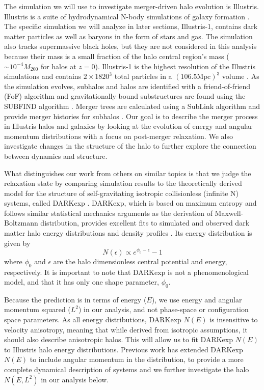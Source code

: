 \documentclass[a4paper,11pt]{article}
\begin{document}
The simulation we will use to investigate merger-driven halo evolution is Illustris.  Illustris is a suite of hydrodynamical N-body 
simulations of galaxy formation \citep{Vog15}.  The specific simulation we will analyze in later sections, Illustris-1, contains dark matter particles as well as baryons 
in the form of stars and gas.  The simulation also tracks supermassive black holes, but they are not considered in this analysis 
because their mass is a small fraction of the halo central region's mass ($\sim10^{-4}M_{200}$ for halos at $z=0$).  Illustris-1 is the highest resolution of the Illustris simulations and contains 
$2\times1820^3$ total particles in a $(106.5\text{Mpc})^3$ volume \citep{Vog14}.  As the simulation evolves, subhalos and halos are identified with a 
friend-of-friend (FoF) algorithm \citep{Dav85} and gravitationally bound substructures are found using the SUBFIND algorithm \citep{Spr01,Dol09}.  Merger 
trees are calculated using a SubLink algorithm and provide merger histories for subhalos \citep{Rod15}.  
Our goal is to describe the merger process in Illustris halos and galaxies by looking at the evolution of energy and angular momentum distributions with a focus on 
post-merger relaxation.  We also investigate changes in the structure of the halo to further explore the connection between dynamics and structure.  

What distinguishes our work from others on similar topics is that we judge the relaxation state by comparing simulation results to the theoretically derived 
model for the structure of self-gravitating isotropic collisionless (infinite N) systems, called DARKexp \citep{Hjo10,Wil10}.  DARKexp, which is based on maximum 
entropy and follows similar statistical mechanics arguments as the derivation of Maxwell-Boltzmann distribution, provides excellent fits to 
simulated and observed dark matter halo energy distributions and density profiles \citep{Ber13,Hjo15,Ume16,Nol16,You16}.  Its energy distribution is given by
\begin{equation}
 N(\epsilon)\propto e^{\phi_0-\epsilon}-1
\end{equation}
where $\phi_0$ and $\epsilon$ are the halo dimensionless central potential and energy, respectively.  It is important to note that DARKexp is not a phenomenological model, and that it has only one shape parameter, $\phi_0$.  

Because the prediction is in terms of energy ($E$), we use energy and 
angular momentum squared ($L^2$) in our analysis, and not phase-space or configuration space parameters.  As all energy distributions, DARKexp $N(E)$ is insensitive to 
velocity anisotropy, meaning that while derived from isotropic assumptions, it should also describe anisotropic halos.  This will 
allow us to fit DARKexp $N(E)$ to Illustris halo energy distributions.  Previous work has extended DARKexp $N(E)$ to include angular 
momentum in the distribution, to provide a more complete dynamical description of systems \citep{Wil10b,Wil14}
and we further investigate the halo $N(E,L^2)$ in our analysis below. 
\end{document}
